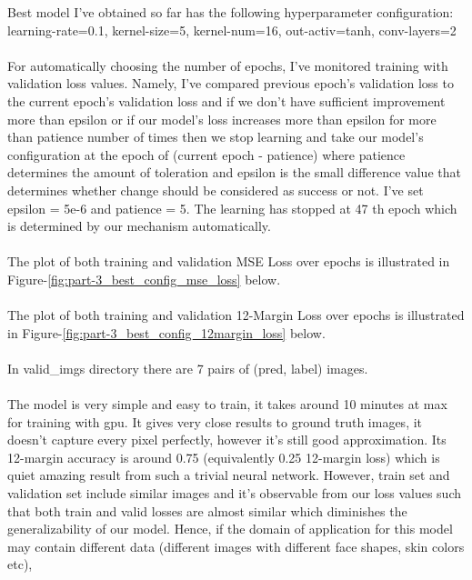 \documentclass[12pt]{article}
\begin{document}
    \begin{center}
        \raggedright
        Best model I've obtained so far has the following hyperparameter configuration:
        \\
        learning-rate=0.1, kernel-size=5, kernel-num=16, out-activ=tanh, conv-layers=2
        \\~\\
        For automatically choosing the number of epochs, I've monitored training with validation loss values. Namely,
        I've compared previous epoch's validation loss to the current epoch's validation loss and
        if we don't have sufficient improvement more than epsilon or if our model's loss increases more than epsilon
        for more than patience number of times then we stop learning and take our model's configuration at the epoch of (current epoch - patience) where
        patience determines the amount of toleration and epsilon is the small difference value that determines whether change should be considered as success or not.
        I've set epsilon = 5e-6  and patience = 5. The learning has stopped at 47 th epoch which is determined by our mechanism automatically.
        \\~\\
        The plot of both training and validation MSE Loss over epochs is illustrated in Figure-\ref*{fig:part-3_best_config_mse_loss} below.
        \\~\\
        The plot of both training and validation 12-Margin Loss over epochs is illustrated in Figure-\ref*{fig:part-3_best_config_12margin_loss} below.
        \\~\\
        In valid\_imgs directory there are 7 pairs of (pred, label) images.
        \\~\\
        The model is very simple and easy to train, it takes around 10 minutes at max for training with gpu.
        It gives very close results to ground truth images, it doesn't capture every pixel perfectly, however it's still good approximation.
        Its 12-margin accuracy is around 0.75 (equivalently 0.25 12-margin loss) which is quiet amazing result from such a trivial neural network.
        However, train set and validation set include similar images and 
        it's observable from our loss values such that both train and valid 
        losses are almost similar which diminishes the generalizability of our model.
        Hence, if the domain of application for this model may contain different data (different images with different face shapes, skin colors etc),

\end{center}
\end{document}
